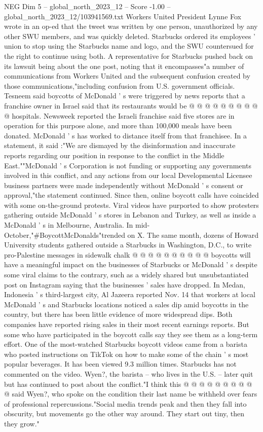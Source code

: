 \begin{textsample}{NEG Dim 5 – global\_north\_2023\_12 – Score -1.00 – global\_north\_2023\_12/103941569.txt}
Workers United President Lynne Fox wrote in an op-ed that the tweet was written by one person, unauthorized by any other SWU members, and was quickly deleted.
Starbucks ordered its employees ' union to stop using the Starbucks name and logo, and the SWU countersued for the right to continue using both.
A representative for Starbucks pushed back on its lawsuit being about the one post, noting that it encompasses"a number of communications from Workers United and the subsequent confusion created by those communications,"including confusion from U.S. government officials.
Tesneem said boycotts of McDonald ' s were triggered by news reports that a franchise owner in Israel said that its restaurants would be @ @ @ @ @ @ @ @ @ @ hospitals.
Newsweek reported the Israeli franchise said five stores are in operation for this purpose alone, and more than 100,000 meals have been donated.
McDonald ' s has worked to distance itself from that franchisee.
In a statement, it said :"We are dismayed by the disinformation and inaccurate reports regarding our position in response to the conflict in the Middle East.""McDonald ' s Corporation is not funding or supporting any governments involved in this conflict, and any actions from our local Developmental Licensee business partners were made independently without McDonald ' s consent or approval,"the statement continued.
Since then, online boycott calls have coincided with some on-the-ground protests.
Viral videos have purported to show protesters gathering outside McDonald ' s stores in Lebanon and Turkey, as well as inside a McDonald ' s in Melbourne, Australia.
In mid-October,"\#BoycottMcDonalds"trended on X.
The same month, dozens of Howard University students gathered outside a Starbucks in Washington, D.C., to write pro-Palestine messages in sidewalk chalk @ @ @ @ @ @ @ @ @ @ boycotts will have a meaningful impact on the businesses of Starbucks or McDonald ' s despite some viral claims to the contrary, such as a widely shared but unsubstantiated post on Instagram saying that the businesses ' sales have dropped.
In Medan, Indonesia ' s third-largest city, Al Jazeera reported Nov. 14 that workers at local McDonald ' s and Starbucks locations noticed a sales dip amid boycotts in the country, but there has been little evidence of more widespread dips.
Both companies have reported rising sales in their most recent earnings reports.
But some who have participated in the boycott calls say they see them as a long-term effort.
One of the most-watched Starbucks boycott videos came from a barista who posted instructions on TikTok on how to make some of the chain ' s most popular beverages.
It has been viewed 9.3 million times.
Starbucks has not commented on the video.
Wyen?, the barista -- who lives in the U.S. -- later quit but has continued to post about the conflict."I think this @ @ @ @ @ @ @ @ @ @ said Wyen?, who spoke on the condition their last name be withheld over fears of professional repercussions."Social media trends peak and then they fall into obscurity, but movements go the other way around.
They start out tiny, then they grow."

\end{textsample}

